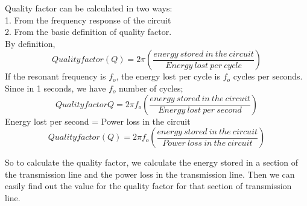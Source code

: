 Quality factor can be calculated in two ways:\\
1. From the frequency response of the circuit\\
2. From the basic definition of quality factor.\\

By definition,
\begin{dmath}
Quality factor(Q) =2\pi\left(\frac{ energy\ stored\ in\ the\ circuit  }{Energy\ lost\ per\ cycle}\right) 
\end{dmath}  
If the resonant frequency is $ f_{o} $, the energy lost per cycle is $ f_{o} $ cycles per seconds. Since in 1 seconds, we have $ f_{o} $ number of cycles;\\
\begin{dmath}
Quality factor Q=2 \pi f_{o}\left(\frac{energy\ stored\ in\ the\ circuit }{Energy\ lost\ per\ second}\right)
\end{dmath}
 Energy lost per second = Power loss in the circuit  
\begin{dmath}
Quality factor (Q)=2 \pi f_{o}\left(\frac{energy\ stored\ in\ the\ circuit }{Power\ loss\ in\ the\ circuit}\right)
\end{dmath}

So to calculate the quality factor, we calculate the energy stored in a section of the transmission line and the power loss in the transmission line. Then we can easily find out the value for the quality factor for that section of transmission line.\\

